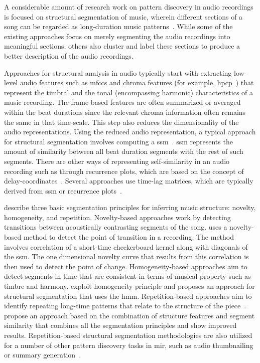 A considerable amount of research work on pattern discovery in audio recordings is focused on structural segmentation of music, wherein different sections of a song can be regarded as long-duration music patterns~\citep{paulus2010state}. While some of the existing approaches focus on merely segmenting the audio recordings into meaningful sections, others also cluster and label these sections to produce a better description of the audio recordings. 

Approaches for structural analysis in audio typically start with extracting low-level audio features such as \glspl{mfcc} and chroma features (for example, \gls{hpcp}~\citep{gomez2006tonal}) that represent the timbral and the tonal (encompassing harmonic) characteristics of a music recording. The frame-based features are often summarized or averaged within the beat durations since the relevant chroma information often remains the same in that time-scale. This step also reduces the dimensionality of the audio representations. Using the reduced audio representation, a typical approach for structural segmentation involves computing a \gls{ssm}~\citep{foote2000automatic}. \Gls{ssm} represents the amount of similarity between all beat duration segments with the rest of such segments. There are other ways of representing self-similarity in an audio recording such as through recurrence plots, which are based on the concept of delay-coordinates~\citep{serra2014unsupervised}. Several approaches use time-lag matrices, which are typically derived from \gls{ssm} or recurrence plots~\citep{Goto06TASLP}.

\cite{paulus2010state} describe three basic segmentation principles for inferring music structure: novelty, homogeneity, and repetition. Novelty-based approaches work by detecting transitions between acoustically contrasting segments of the song. \cite{foote2000automatic} uses a novelty-based method to detect the point of transition in a recording. The method involves correlation of a short-time checkerboard kernel along with diagonals of the \gls{ssm}. The one dimensional novelty curve that results from this correlation is then used to detect the point of change. Homogeneity-based approaches aim to detect segments in time that are consistent in terms of musical property such as timbre and harmony. \cite{levy2008structural} exploit homogeneity principle and proposes an approach for structural segmentation that uses the \acrfull{hmm}. Repetition-based approaches aim to identify repeating long-time patterns that relate to the structure of the piece~\citep{Goto06TASLP,dannenberg2003pattern,muller2006towards}. \cite{serra2014unsupervised} propose an approach based on the combination of structure features and segment similarity that combines all the segmentation principles and show improved results. Repetition-based structural segmentation methodologies are also utilized for a number of other pattern discovery tasks in \gls{mir}, such as audio thumbnailing or summary generation~\citep{chai2003music,aucouturier2002finding,muller2013robust,nieto2012compressing}. 

